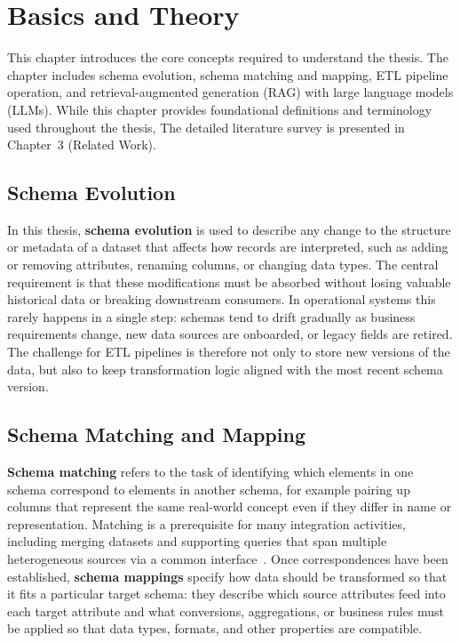 \section{Basics and Theory}
\label{sec:basics-theory}

This chapter introduces the core concepts required to understand the thesis. The chapter includes schema evolution, schema matching and mapping, ETL pipeline operation, and retrieval-augmented generation (RAG) with large language models (LLMs). While this chapter provides foundational definitions and terminology used throughout the thesis, The detailed literature survey is presented in Chapter~3 (Related Work).

\subsection{Schema Evolution}

In this thesis, \textbf{schema evolution} is used to describe any change to the structure or metadata of a dataset that affects how records are interpreted, such as adding or removing attributes, renaming columns, or changing data types. The central requirement is that these modifications must be absorbed without losing valuable historical data or breaking downstream consumers. In operational systems this rarely happens in a single step: schemas tend to drift gradually as business requirements change, new data sources are onboarded, or legacy fields are retired. The challenge for ETL pipelines is therefore not only to store new versions of the data, but also to keep transformation logic aligned with the most recent schema version.

\subsection{Schema Matching and Mapping}

\textbf{Schema matching} refers to the task of identifying which elements in one schema correspond to elements in another schema, for example pairing up columns that represent the same real‑world concept even if they differ in name or representation. Matching is a prerequisite for many integration activities, including merging datasets and supporting queries that span multiple heterogeneous sources via a common interface~\cite{doan2005semantic}. Once correspondences have been established, \textbf{schema mappings} specify how data should be transformed so that it fits a particular target schema: they describe which source attributes feed into each target attribute and what conversions, aggregations, or business rules must be applied so that data types, formats, and other properties are compatible.

